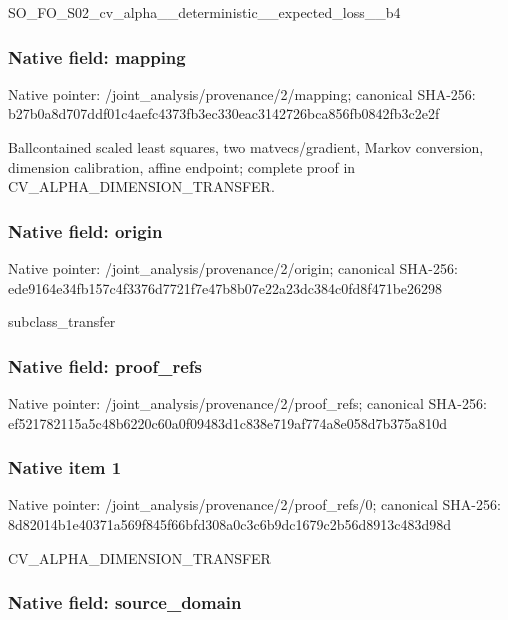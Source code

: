 \documentclass[10pt,a4paper]{article}
\begin{document}
SO\_FO\_S02\_cv\_alpha\_\_dete\allowbreak{}rministic\_\_expected\_loss\allowbreak{}\_\_b4


\subsubsection{Native field: mapping}


Native pointer: /joint\_analysis/provenance/2/mapping; canonical SHA-256: b27b0a8d707ddf01c4aefc43\allowbreak{}73fb3ec330eac3142726bca8\allowbreak{}56fb0842fb3c2e2f


Ballcontained scaled least squares, two matvecs/gradient, Markov conversion, dimension calibration, affine endpoint; complete proof in CV\_ALPHA\_DIMENSION\_TRANSFER.


\subsubsection{Native field: origin}


Native pointer: /joint\_analysis/provenance/2/origin; canonical SHA-256: ede9164e34fb157c4f3376d7\allowbreak{}721f7e47b8b07e22a23dc384\allowbreak{}c0fd8f471be26298


subclass\_transfer


\subsubsection{Native field: proof\_refs}


Native pointer: /joint\_analysis/provenance/2/proof\_refs; canonical SHA-256: ef521782115a5c48b6220c60\allowbreak{}a0f09483d1c838e719af774a\allowbreak{}8e058d7b375a810d



\subsubsection{Native item 1}


Native pointer: /joint\_analysis/provenan\allowbreak{}ce/2/proof\_refs/0; canonical SHA-256: 8d82014b1e40371a569f845f\allowbreak{}66bfd308a0c3c6b9dc1679c2\allowbreak{}b56d8913c483d98d


CV\_ALPHA\_DIMENSION\_TRANSFER


\subsubsection{Native field: source\_domain}
\end{document}
